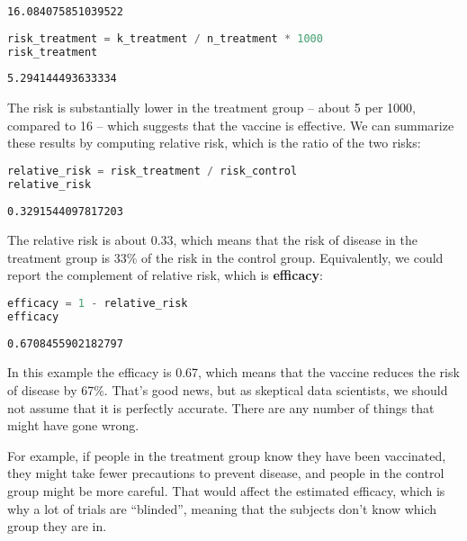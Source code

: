 \begin{lstlisting}[style=output]
16.084075851039522
\end{lstlisting}

\begin{lstlisting}[language=Python,style=source]
risk_treatment = k_treatment / n_treatment * 1000
risk_treatment
\end{lstlisting}

\begin{lstlisting}[style=output]
5.294144493633334
\end{lstlisting}

The risk is substantially lower in the treatment group -- about 5 per
1000, compared to 16 -- which suggests that the vaccine is effective. We
can summarize these results by computing relative risk, which is the
ratio of the two risks:

\begin{lstlisting}[language=Python,style=source]
relative_risk = risk_treatment / risk_control
relative_risk
\end{lstlisting}

\begin{lstlisting}[style=output]
0.3291544097817203
\end{lstlisting}

The relative risk is about 0.33, which means that the risk of disease in
the treatment group is 33\% of the risk in the control group.
Equivalently, we could report the complement of relative risk, which is
\textbf{efficacy}:

\begin{lstlisting}[language=Python,style=source]
efficacy = 1 - relative_risk
efficacy
\end{lstlisting}

\begin{lstlisting}[style=output]
0.6708455902182797
\end{lstlisting}

In this example the efficacy is 0.67, which means that the vaccine
reduces the risk of disease by 67\%. That's good news, but as skeptical
data scientists, we should not assume that it is perfectly accurate.
There are any number of things that might have gone wrong.

For example, if people in the treatment group know they have been
vaccinated, they might take fewer precautions to prevent disease, and
people in the control group might be more careful. That would affect the
estimated efficacy, which is why a lot of trials are ``blinded'',
meaning that the subjects don't know which group they are in.

